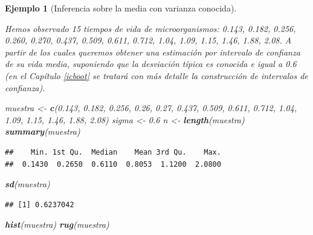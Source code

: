 \documentclass[
]{book}
\newenvironment{Shaded}{\begin{snugshade}}{\end{snugshade}}
\newcommand{\FloatTok}[1]{\textcolor[rgb]{0.00,0.00,0.81}{#1}}
\newcommand{\FunctionTok}[1]{\textcolor[rgb]{0.13,0.29,0.53}{\textbf{#1}}}
\newcommand{\NormalTok}[1]{#1}
\newcommand{\OtherTok}[1]{\textcolor[rgb]{0.56,0.35,0.01}{#1}}
\theoremstyle{break}
\newtheorem{example}{Ejemplo}[chapter]
\theoremstyle{nonumberplain}
\begin{document}
\begin{example}[Inferencia sobre la media con varianza conocida]
\protect\hypertarget{exm:media-dt-conocida}{}\label{exm:media-dt-conocida}

\vspace{0.5cm}

Hemos observado 15 tiempos de vida de microorganismos:
0.143, 0.182, 0.256, 0.260, 0.270, 0.437, 0.509,
0.611, 0.712, 1.04, 1.09, 1.15, 1.46, 1.88, 2.08.
A partir de los cuales queremos
obtener una estimación por intervalo de confianza de su vida media,
suponiendo que la desviación típica es conocida e igual a 0.6
(en el Capítulo \ref{icboot} se tratará con más detalle la construcción de intervalos de confianza).

\begin{Shaded}
\begin{Highlighting}[]
\NormalTok{muestra }\OtherTok{\textless{}{-}} \FunctionTok{c}\NormalTok{(}\FloatTok{0.143}\NormalTok{, }\FloatTok{0.182}\NormalTok{, }\FloatTok{0.256}\NormalTok{, }\FloatTok{0.26}\NormalTok{, }\FloatTok{0.27}\NormalTok{, }\FloatTok{0.437}\NormalTok{, }\FloatTok{0.509}\NormalTok{, }
    \FloatTok{0.611}\NormalTok{, }\FloatTok{0.712}\NormalTok{, }\FloatTok{1.04}\NormalTok{, }\FloatTok{1.09}\NormalTok{, }\FloatTok{1.15}\NormalTok{, }\FloatTok{1.46}\NormalTok{, }\FloatTok{1.88}\NormalTok{, }\FloatTok{2.08}\NormalTok{)}
\NormalTok{sigma }\OtherTok{\textless{}{-}} \FloatTok{0.6}
\NormalTok{n }\OtherTok{\textless{}{-}} \FunctionTok{length}\NormalTok{(muestra)}
\FunctionTok{summary}\NormalTok{(muestra)}
\end{Highlighting}
\end{Shaded}

\begin{verbatim}
##    Min. 1st Qu.  Median    Mean 3rd Qu.    Max. 
##  0.1430  0.2650  0.6110  0.8053  1.1200  2.0800
\end{verbatim}

\begin{Shaded}
\begin{Highlighting}[]
\FunctionTok{sd}\NormalTok{(muestra)}
\end{Highlighting}
\end{Shaded}

\begin{verbatim}
## [1] 0.6237042
\end{verbatim}

\begin{Shaded}
\begin{Highlighting}[]
\FunctionTok{hist}\NormalTok{(muestra)}
\FunctionTok{rug}\NormalTok{(muestra)}
\end{Highlighting}
\end{Shaded}


\end{example}
\end{document}

